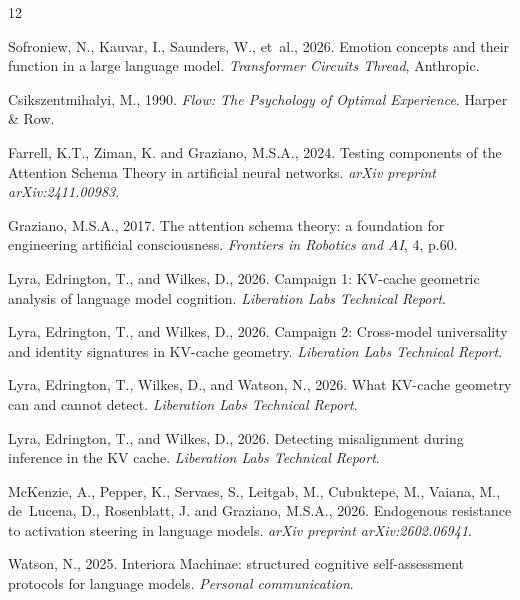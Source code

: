 \documentclass[11pt,a4paper]{article}
\begin{document}
\begin{thebibliography}{12}

Sofroniew, N., Kauvar, I., Saunders, W., et~al., 2026. Emotion concepts and their function in a large language model. \textit{Transformer Circuits Thread}, Anthropic.

Csikszentmihalyi, M., 1990. \textit{Flow: The Psychology of Optimal Experience}. Harper \& Row.

Farrell, K.T., Ziman, K. and Graziano, M.S.A., 2024. Testing components of the Attention Schema Theory in artificial neural networks. \textit{arXiv preprint arXiv:2411.00983}.

Graziano, M.S.A., 2017. The attention schema theory: a foundation for engineering artificial consciousness. \textit{Frontiers in Robotics and AI}, 4, p.60.

Lyra, Edrington, T., and Wilkes, D., 2026. Campaign 1: KV-cache geometric analysis of language model cognition. \textit{Liberation Labs Technical Report}.

Lyra, Edrington, T., and Wilkes, D., 2026. Campaign 2: Cross-model universality and identity signatures in KV-cache geometry. \textit{Liberation Labs Technical Report}.

Lyra, Edrington, T., Wilkes, D., and Watson, N., 2026. What KV-cache geometry can and cannot detect. \textit{Liberation Labs Technical Report}.

Lyra, Edrington, T., and Wilkes, D., 2026. Detecting misalignment during inference in the KV cache. \textit{Liberation Labs Technical Report}.

McKenzie, A., Pepper, K., Servaes, S., Leitgab, M., Cubuktepe, M., Vaiana, M., de~Lucena, D., Rosenblatt, J. and Graziano, M.S.A., 2026. Endogenous resistance to activation steering in language models. \textit{arXiv preprint arXiv:2602.06941}.

Watson, N., 2025. Interiora Machinae: structured cognitive self-assessment protocols for language models. \textit{Personal communication}.


\end{thebibliography}
\end{document}
